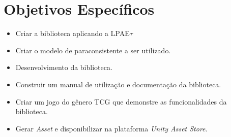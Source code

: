 \section{Objetivos Específicos}
	\begin{itemize}
		\item Criar a biblioteca aplicando a LPAE$\tau$
		\item Criar o modelo de paraconsistente a ser utilizado.
		\item Desenvolvimento da biblioteca.
		\item Construir um manual de utilização e documentação da biblioteca.
		\item Criar um jogo do gênero TCG que demonstre as funcionalidades da biblioteca.
		\item Gerar \textit{Asset} e disponibilizar na plataforma \textit{Unity Asset Store}.
	\end{itemize}


